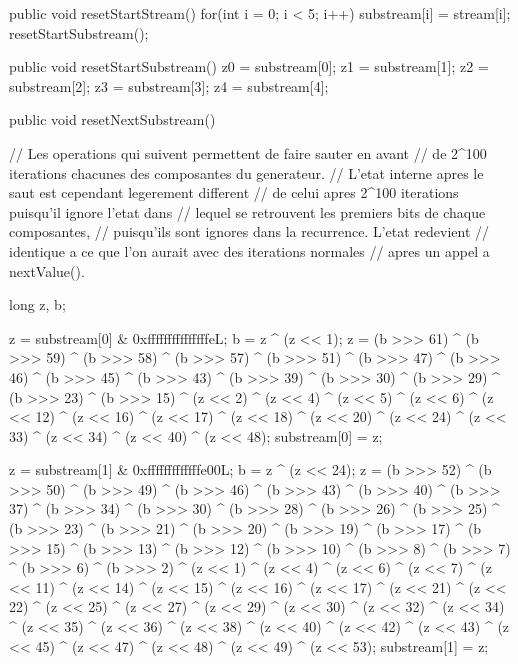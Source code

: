 \begin{code}
  \begin{hide}



    public void resetStartStream() {
        for(int i = 0; i < 5; i++)
            substream[i] = stream[i];
        resetStartSubstream();
    }

    public void resetStartSubstream() {
        z0 = substream[0];
        z1 = substream[1];
        z2 = substream[2];
        z3 = substream[3];
        z4 = substream[4];
    }

    public void resetNextSubstream() {
        // Les operations qui suivent permettent de faire sauter en avant
        // de 2^100 iterations chacunes des composantes du generateur.
        // L'etat interne apres le saut est cependant legerement different
        // de celui apres 2^100 iterations puisqu'il ignore l'etat dans
        // lequel se retrouvent les premiers bits de chaque composantes,
        // puisqu'ils sont ignores dans la recurrence. L'etat redevient
        // identique a ce que l'on aurait avec des iterations normales
        // apres un appel a nextValue().

       long z, b;

        z = substream[0] & 0xfffffffffffffffeL;
        b = z ^ (z << 1);
        z = (b >>> 61) ^ (b >>> 59) ^ (b >>> 58) ^ (b >>> 57) ^ (b >>> 51) ^
            (b >>> 47) ^ (b >>> 46) ^ (b >>> 45) ^ (b >>> 43) ^ (b >>> 39) ^
            (b >>> 30) ^ (b >>> 29) ^ (b >>> 23) ^ (b >>> 15) ^ (z << 2) ^
            (z << 4) ^ (z << 5) ^ (z << 6) ^ (z << 12) ^ (z << 16) ^
            (z << 17) ^ (z << 18) ^ (z << 20) ^ (z << 24) ^ (z << 33) ^
            (z << 34) ^ (z << 40) ^ (z << 48);
        substream[0] = z;


        z = substream[1] & 0xfffffffffffffe00L;
        b = z ^ (z << 24);
        z = (b >>> 52) ^ (b >>> 50) ^ (b >>> 49) ^ (b >>> 46) ^ (b >>> 43) ^
            (b >>> 40) ^ (b >>> 37) ^ (b >>> 34) ^ (b >>> 30) ^ (b >>> 28) ^
            (b >>> 26) ^ (b >>> 25) ^ (b >>> 23) ^ (b >>> 21) ^ (b >>> 20) ^
            (b >>> 19) ^ (b >>> 17) ^ (b >>> 15) ^ (b >>> 13) ^ (b >>> 12) ^
            (b >>> 10) ^ (b >>> 8) ^ (b >>> 7) ^ (b >>> 6) ^ (b >>> 2) ^
            (z << 1) ^ (z << 4) ^ (z << 6) ^ (z << 7) ^ (z << 11) ^ (z << 14) ^
            (z << 15) ^ (z << 16) ^ (z << 17) ^ (z << 21) ^ (z << 22) ^
            (z << 25) ^ (z << 27) ^ (z << 29) ^ (z << 30) ^ (z << 32) ^
            (z << 34) ^ (z << 35) ^ (z << 36) ^ (z << 38) ^ (z << 40) ^
            (z << 42) ^ (z << 43) ^ (z << 45) ^ (z << 47) ^ (z << 48) ^
            (z << 49) ^ (z << 53);
        substream[1] = z;


}
\end{hide}
\end{code}
